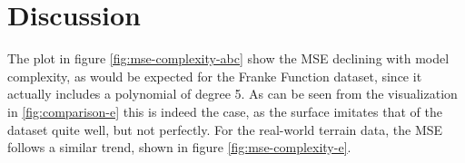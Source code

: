 \section{Discussion}
The plot in figure \ref{fig:mse-complexity-abc} show the MSE declining with model complexity,
as would be expected for the Franke Function dataset, since it actually includes a polynomial
of degree 5.
As can be seen from the visualization in \ref{fig:comparison-e} this is indeed the case,
as the surface imitates that of the dataset quite well, but not perfectly.
For the real-world terrain data, the MSE follows a similar trend, shown in
figure \ref{fig:mse-complexity-e}.



